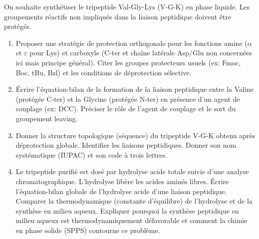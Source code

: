 \documentclass[11pt]{article}
\begin{document}
\begin{exercice}
On souhaite synthétiser le tripeptide Val-Gly-Lys (V-G-K) en phase liquide. Les groupements réactifs non impliqués dans la liaison peptidique doivent être protégés.
\begin{enumerate}
    \item Proposer une stratégie de protection orthogonale pour les fonctions amine ($\alpha$ et $\varepsilon$ pour Lys) et carboxyle (C-ter et chaîne latérale Asp/Glu non concernées ici mais principe général). Citer les groupes protecteurs usuels (ex: Fmoc, Boc, tBu, Bzl) et les conditions de déprotection sélective.
    \item Écrire l'équation-bilan de la formation de la liaison peptidique entre la Valine (protégée C-ter) et la Glycine (protégée N-ter) en présence d'un agent de couplage (ex: DCC). Préciser le rôle de l'agent de couplage et le sort du groupement leaving.
    \item Donner la structure topologique (séquence) du tripeptide V-G-K obtenu après déprotection globale. Identifier les liaisons peptidiques. Donner son nom systématique (IUPAC) et son code à trois lettres.
    \item Le tripeptide purifié est dosé par hydrolyse acide totale suivie d'une analyse chromatographique. L'hydrolyse libère les acides aminés libres. Écrire l'équation-bilan globale de l'hydrolyse acide d'une liaison peptidique. Comparer la thermodynamique (constante d'équilibre) de l'hydrolyse et de la synthèse en milieu aqueux. Expliquer pourquoi la synthèse peptidique en milieu aqueux est thermodynamiquement défavorable et comment la chimie en phase solide (SPPS) contourne ce problème.
\end{enumerate}
\end{exercice}
\end{document}
